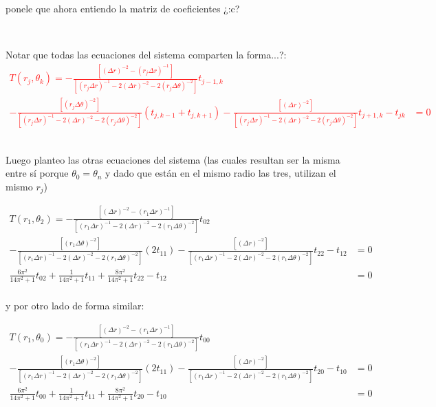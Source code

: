 \documentclass{article}
\begin{document}
\noindent ponele que ahora entiendo la matriz de coeficientes ¿:c?

\

Notar que todas las ecuaciones del sistema comparten la forma...?:
\textcolor{red}{
\begin{align*}
    T(r_j,\theta_k) =-\frac{[{(\Delta r)}^{-2} - {(r_j\Delta r)}^{-1}]}{[{(r_j\Delta r)}^{-1} - 2{(\Delta r)}^{-2} - 2{(r_{j}\Delta \theta)}^{-2}]}t_{j-1,k}
    & \\
    -\frac{[{(r_{j}\Delta \theta)}^{-2}]}{[{(r_j\Delta r)}^{-1} - 2{(\Delta r)}^{-2} - 2{(r_{j}\Delta \theta)}^{-2}]}(t_{j,k-1} + t_{j,k+1})
    -\frac{[{(\Delta r)}^{-2}]}{[{(r_j\Delta r)}^{-1} - 2{(\Delta r)}^{-2} - 2{(r_{j}\Delta \theta)}^{-2}]}t_{j+1,k}  - t_{jk} &= 0
\end{align*}
}
\

\noindent Luego planteo las otras ecuaciones del sistema 
(las cuales resultan ser la misma entre sí porque $\theta_0 = \theta_n$ y 
dado que están en el mismo radio las tres, utilizan el mismo $r_j$)

\begin{align*}
    T(r_1,\theta_2) = -\frac{[{(\Delta r)}^{-2} - {(r_1\Delta r)}^{-1}]}{[{(r_1\Delta r)}^{-1} - 2{(\Delta r)}^{-2} - 2{(r_{1}\Delta \theta)}^{-2}]}t_{02}
    & \\
    -\frac{[{(r_{1}\Delta \theta)}^{-2}]}{[{(r_1\Delta r)}^{-1} - 2{(\Delta r)}^{-2} - 2{(r_{1}\Delta \theta)}^{-2}]}(2t_{11})
    -\frac{[{(\Delta r)}^{-2}]}{[{(r_1\Delta r)}^{-1} - 2{(\Delta r)}^{-2} - 2{(r_{1}\Delta \theta)}^{-2}]}t_{22}  - t_{12} &= 0\\
    \frac{6\pi^2}{14\pi^2 + 1}t_{02}
    +\frac{1}{14\pi^2 + 1}t_{11}
    +\frac{8\pi^2}{14\pi^2 + 1}t_{22} - t_{12} &= 0 \\
\end{align*}

y por otro lado de forma similar:

\begin{align*}
    T(r_1,\theta_0) = -\frac{[{(\Delta r)}^{-2} - {(r_1\Delta r)}^{-1}]}{[{(r_1\Delta r)}^{-1} - 2{(\Delta r)}^{-2} - 2{(r_{1}\Delta \theta)}^{-2}]}t_{00}
    & \\
    -\frac{[{(r_{1}\Delta \theta)}^{-2}]}{[{(r_1\Delta r)}^{-1} - 2{(\Delta r)}^{-2} - 2{(r_{1}\Delta \theta)}^{-2}]}(2t_{11})
    -\frac{[{(\Delta r)}^{-2}]}{[{(r_1\Delta r)}^{-1} - 2{(\Delta r)}^{-2} - 2{(r_{1}\Delta \theta)}^{-2}]}t_{20} - t_{10} &= 0 \\
    \frac{6\pi^2}{14\pi^2 + 1}t_{00}
    +\frac{1}{14\pi^2 + 1}t_{11}
    +\frac{8\pi^2}{14\pi^2 + 1}t_{20} - t_{10} &= 0 \\
\end{align*}
\end{document}
